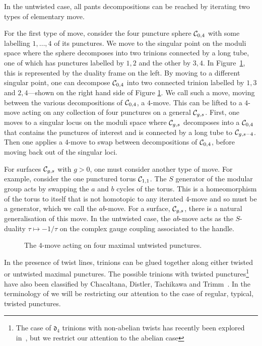\documentclass[a4paper]{article}
\def\CC{{\cal C}}
\def\df{\mathfrak{d}}
\begin{document}
In the untwisted case, all pants decompositions can be reached by iterating two types of elementary move.

For the first type of move, consider the four puncture sphere $\CC_{0,4}$ with some labelling  $1,\dots,4$ of its punctures. We move to the singular point on the moduli space where the sphere decomposes into two trinions connected by a long tube, one of which has punctures labelled by $1,2$ and the other by $3,4$. In Figure~\ref{fig:4-move}, this is represented by the duality frame on the left. By moving to a different singular point, one can decompose $\CC_{0,4}$ into two connected trinion labelled by $1,3$ and $2,4$---shown on the right hand side of Figure \ref{fig:4-move}. We call such a move, moving between the various decompositions of $\CC_{0,4}$, a $4$-move. This can be lifted to a $4$-move acting on any collection of four punctures on a general $\CC_{g,s}$. First, one moves to a singular locus on the moduli space where $\CC_{g,s}$ decomposes into a $\CC_{0,4}$ that contains the punctures of interest and is connected by a long tube to $\CC_{g,s-4}$. Then one applies a $4$-move to swap between decompositions of $\CC_{0,4}$, before moving back out of the singular loci.

For surfaces $\CC_{g,s}$ with $g>0$, one must consider another type of move. For example, consider the one punctured torus $\CC_{1,1}$. The $S$ generator of the modular group acts by swapping the $a$ and $b$ cycles of the torus. This is a homeomorphism of the torus to itself that is not homotopic to any iterated $4$-move and so must be a generator, which we call the $ab$-move. For a surface, $\CC_{g,s}$, there is a natural generalisation of this move. In the untwisted case, the $ab$-move acts as the $S$-duality $\tau\mapsto -1/\tau$ on the complex gauge coupling associated to the handle.
\begin{figure}[h]
\caption{The $4$-move acting on four maximal untwisted punctures.}
\label{fig:4-move}
\end{figure}

In the presence of twist lines, trinions can be glued together along either twisted or untwisted maximal punctures. The possible trinions with twisted punctures\footnote{The case of $\df_4$ trinions with non-abelian twists has recently been explored in~\cite{Distler:2021cwz}, but we restrict our attention to the abelian case} have also been classified by Chacaltana, Distler, Tachikawa and Trimm~\cite{Chacaltana:2012ch,Chacaltana:2013oka}. In the terminology of \cite{Chacaltana:2012ch} we will be restricting our attention to the case of regular, typical, twisted punctures.
\end{document}
